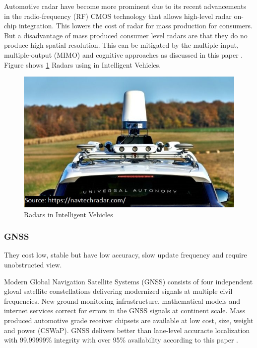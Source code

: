 \begin{spacing}{1.5}
\begin{sloppypar}
Automotive radar have become more prominent due to its recent advancements in the radio-frequency (RF) CMOS technology that allows high-level radar on-chip integration. This lowers the cost of radar for mass production for consumers. But a disadvantage of mass produced consumer level radars are that they do no produce high spatial resolution. This can be mitigated by the multiple-input, multiple-output (MIMO) and cognitive approaches as discussed in this paper \cite{bilik2019rise}. Figure shows \ref{fig:radars} Radars using in Intelligent Vehicles. 

\begin{figure}[h]
\begin{center}
\includegraphics[scale=0.7]{2/radar.jpg}
\caption{Radars in Intelligent Vehicles}
\label{fig:radars}
\end{center}
\end{figure}

\subsubsection{GNSS}
They cost low, stable but have low accuracy, slow update frequency and require unobstructed view.

Modern Global Navigation Satellite Systems (GNSS) consists of four independent gloval satellite constellations delivering modernized signals at multiple civil frequencies. New ground monitoring infrastructure, mathematical models and internet services correct for errors in the GNSS signals at continent scale. Mass produced automotive grade receiver chipsets are available at low cost, size, weight and power (CSWaP). GNSS delivers better than lane-level accuracte localization with 99.99999\% integrity with over 95\% availability according to this paper \cite{joubert2020developments}. 



\end{sloppypar}
\end{spacing}
